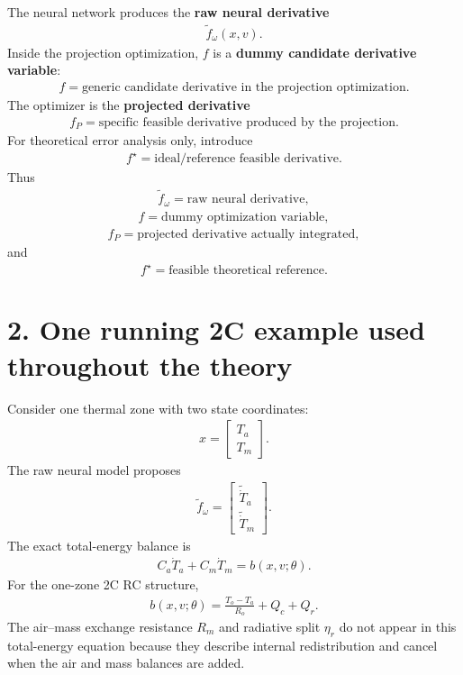 \documentclass[11pt]{article}
\begin{document}
The neural network produces the \textbf{raw neural derivative}
\begin{align}
\boxed{\widetilde f_\omega(x,v).}
\tag{E5.1}
\end{align}
Inside the projection optimization, \(f\) is a \textbf{dummy candidate derivative variable}:
\begin{align}
\boxed{f=\text{generic candidate derivative in the projection optimization}.}
\tag{E5.2}
\end{align}
The optimizer is the \textbf{projected derivative}
\begin{align}
\boxed{f_P=\text{specific feasible derivative produced by the projection}.}
\tag{E5.3}
\end{align}
For theoretical error analysis only, introduce
\begin{align}
\boxed{f^\star=\text{ideal/reference feasible derivative}.}
\tag{E5.4}
\end{align}
Thus
\begin{align}
\boxed{\widetilde f_\omega=\text{raw neural derivative},}
\tag{E5.5}
\end{align}
\begin{align}
\boxed{f=\text{dummy optimization variable},}
\tag{E5.6}
\end{align}
\begin{align}
\boxed{f_P=\text{projected derivative actually integrated},}
\tag{E5.7}
\end{align}
and
\begin{align}
\boxed{f^\star=\text{feasible theoretical reference}.}
\tag{E5.8}
\end{align}

\section*{2. One running 2C example used throughout the theory}

Consider one thermal zone with two state coordinates:
\begin{align}
\boxed{x=\begin{bmatrix}T_a\\T_m\end{bmatrix}.}
\tag{E5.9}
\end{align}
The raw neural model proposes
\begin{align}
\boxed{\widetilde f_\omega=\begin{bmatrix}\widetilde{\dot T}_a\\\widetilde{\dot T}_m\end{bmatrix}.}
\tag{E5.10}
\end{align}
The exact total-energy balance is
\begin{align}
\boxed{C_a\dot T_a+C_m\dot T_m=b(x,v;\theta).}
\tag{E5.11}
\end{align}
For the one-zone 2C RC structure,
\begin{align}
\boxed{b(x,v;\theta)=\frac{T_o-T_a}{R_o}+Q_c+Q_r.}
\tag{E5.12}
\end{align}
The air--mass exchange resistance \(R_m\) and radiative split \(\eta_r\) do not appear in this total-energy equation because they describe internal redistribution and cancel when the air and mass balances are added.
\end{document}

